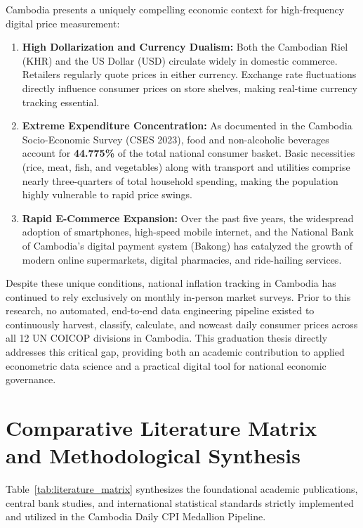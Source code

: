 \hs Cambodia presents a uniquely compelling economic context for high-frequency digital price measurement:
\begin{enumerate}
    \item \textbf{High Dollarization and Currency Dualism:} Both the Cambodian Riel (KHR) and the US Dollar (USD) circulate widely in domestic commerce. Retailers regularly quote prices in either currency. Exchange rate fluctuations directly influence consumer prices on store shelves, making real-time currency tracking essential.
    \item \textbf{Extreme Expenditure Concentration:} As documented in the Cambodia Socio-Economic Survey (CSES 2023), food and non-alcoholic beverages account for \textbf{44.775\%} of the total national consumer basket. Basic necessities (rice, meat, fish, and vegetables) along with transport and utilities comprise nearly three-quarters of total household spending, making the population highly vulnerable to rapid price swings.
    \item \textbf{Rapid E-Commerce Expansion:} Over the past five years, the widespread adoption of smartphones, high-speed mobile internet, and the National Bank of Cambodia's digital payment system (Bakong) has catalyzed the growth of modern online supermarkets, digital pharmacies, and ride-hailing services.
\end{enumerate}

\hs Despite these unique conditions, national inflation tracking in Cambodia has continued to rely exclusively on monthly in-person market surveys. Prior to this research, no automated, end-to-end data engineering pipeline existed to continuously harvest, classify, calculate, and nowcast daily consumer prices across all 12 UN COICOP divisions in Cambodia. This graduation thesis directly addresses this critical gap, providing both an academic contribution to applied econometric data science and a practical digital tool for national economic governance.

\section{Comparative Literature Matrix and Methodological Synthesis}
\hs Table~\ref{tab:literature_matrix} synthesizes the foundational academic publications, central bank studies, and international statistical standards strictly implemented and utilized in the Cambodia Daily CPI Medallion Pipeline.

